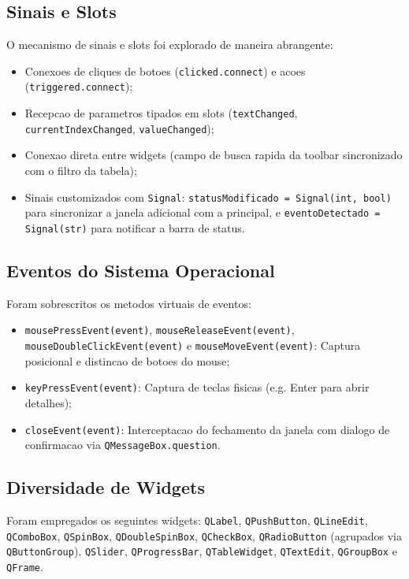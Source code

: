 ﻿\documentclass[12pt]{article}
\begin{document}
\subsection{Sinais e Slots}
O mecanismo de sinais e slots foi explorado de maneira abrangente:
\begin{itemize}
    \item Conexoes de cliques de botoes (\texttt{clicked.connect}) e acoes (\texttt{triggered.connect});
    \item Recepcao de parametros tipados em slots (\texttt{textChanged}, \texttt{currentIndexChanged}, \texttt{valueChanged});
    \item Conexao direta entre widgets (campo de busca rapida da toolbar sincronizado com o filtro da tabela);
    \item Sinais customizados com \texttt{Signal}: \texttt{statusModificado = Signal(int, bool)} para sincronizar a janela adicional com a principal, e \texttt{eventoDetectado = Signal(str)} para notificar a barra de status.
\end{itemize}

\subsection{Eventos do Sistema Operacional}
Foram sobrescritos os metodos virtuais de eventos:
\begin{itemize}
    \item \texttt{mousePressEvent(event)}, \texttt{mouseReleaseEvent(event)}, \texttt{mouseDoubleClickEvent(event)} e \texttt{mouseMoveEvent(event)}: Captura posicional e distincao de botoes do mouse;
    \item \texttt{keyPressEvent(event)}: Captura de teclas fisicas (e.g. Enter para abrir detalhes);
    \item \texttt{closeEvent(event)}: Interceptacao do fechamento da janela com dialogo de confirmacao via \texttt{QMessageBox.question}.
\end{itemize}

\subsection{Diversidade de Widgets}
Foram empregados os seguintes widgets: \texttt{QLabel}, \texttt{QPushButton}, \texttt{QLineEdit}, \texttt{QComboBox}, \texttt{QSpinBox}, \texttt{QDoubleSpinBox}, \texttt{QCheckBox}, \texttt{QRadioButton} (agrupados via \texttt{QButtonGroup}), \texttt{QSlider}, \texttt{QProgressBar}, \texttt{QTableWidget}, \texttt{QTextEdit}, \texttt{QGroupBox} e \texttt{QFrame}.
\end{document}
